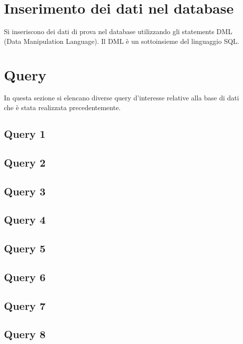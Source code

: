 \documentclass[12pt,a4paper]{article}
\begin{document}
\newpage
\section{Inserimento dei dati nel database}
Si inseriscono dei dati di prova nel database utilizzando gli statements DML (Data Manipulation Language). Il DML è un sottoinsieme del linguaggio SQL.


\newpage
\section{Query}
In questa sezione si elencano diverse query d'interesse relative alla base di dati che è stata realizzata precedentemente.

\subsection{Query 1}

\subsection{Query 2}

\subsection{Query 3}

\newpage
\subsection{Query 4}

\subsection{Query 5}

\subsection{Query 6}

\newpage
\subsection{Query 7}

\subsection{Query 8}

\end{document}
